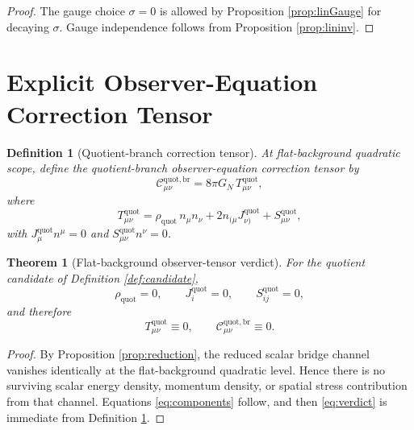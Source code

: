 \documentclass[11pt]{article}
\newtheorem{definition}{Definition}
\newtheorem{theorem}{Theorem}
\begin{document}
\begin{proof}
The gauge choice \(\sigma=0\) is allowed by Proposition \ref{prop:linGauge} for decaying \(\sigma\). Gauge independence follows from Proposition \ref{prop:lininv}.
\end{proof}

\section{Explicit Observer-Equation Correction Tensor}

\begin{definition}[Quotient-branch correction tensor]
\label{def:Cquot}
At flat-background quadratic scope, define the \emph{quotient-branch observer-equation correction tensor} by
\begin{equation}
\mathcal C_{\mu\nu}^{\mathrm{quot,br}}
=
8\pi G_N\,T_{\mu\nu}^{\mathrm{quot}},
\label{eq:Cquot}
\end{equation}
where
\begin{equation}
T_{\mu\nu}^{\mathrm{quot}}
=
\rho_{\mathrm{quot}}\,n_\mu n_\nu
+2n_{(\mu}J_{\nu)}^{\mathrm{quot}}
+S_{\mu\nu}^{\mathrm{quot}},
\label{eq:Tquot}
\end{equation}
with \(J_\mu^{\mathrm{quot}}n^\mu=0\) and \(S_{\mu\nu}^{\mathrm{quot}}n^\nu=0\).
\end{definition}

\begin{theorem}[Flat-background observer-tensor verdict]
\label{thm:verdict}
For the quotient candidate of Definition \ref{def:candidate},
\begin{equation}
\rho_{\mathrm{quot}}=0,
\qquad
J_i^{\mathrm{quot}}=0,
\qquad
S_{ij}^{\mathrm{quot}}=0,
\label{eq:components}
\end{equation}
and therefore
\begin{equation}
T_{\mu\nu}^{\mathrm{quot}}\equiv 0,
\qquad
\mathcal C_{\mu\nu}^{\mathrm{quot,br}}\equiv 0.
\label{eq:verdict}
\end{equation}
\end{theorem}

\begin{proof}
By Proposition \ref{prop:reduction}, the reduced scalar bridge channel vanishes identically at the flat-background quadratic level. Hence there is no surviving scalar energy density, momentum density, or spatial stress contribution from that channel. Equations \eqref{eq:components} follow, and then \eqref{eq:verdict} is immediate from Definition \ref{def:Cquot}.
\end{proof}
\end{document}
